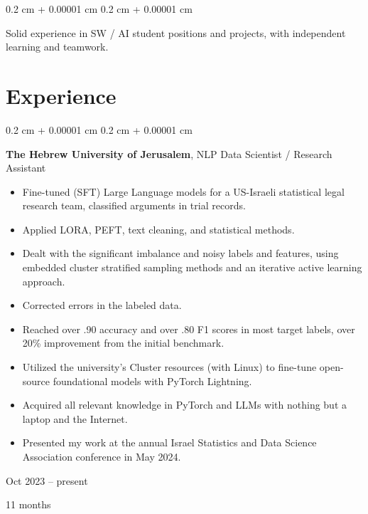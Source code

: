 \documentclass[10pt, letterpaper]{article}
\newenvironment{highlights}{
    \begin{itemize}[
        topsep=0.10 cm,
        parsep=0.10 cm,
        partopsep=0pt,
        itemsep=0pt,
        leftmargin=0.4 cm + 10pt
    ]
}{
    \end{itemize}
} %
\newenvironment{onecolentry}{
    \begin{adjustwidth}{
        0.2 cm + 0.00001 cm
    }{
        0.2 cm + 0.00001 cm
    }
}{
    \end{adjustwidth}
} %
\newenvironment{twocolentry}[2][]{
    \onecolentry
    \def\secondColumn{#2}
    \setcolumnwidth{\fill, 4.5 cm}
    \begin{paracol}{2}
}{
    \switchcolumn \raggedleft \secondColumn
    \end{paracol}
    \endonecolentry
} %
\begin{document}
        \vspace{0.2 cm}

        \begin{onecolentry}
            Solid experience in SW / AI student positions and projects, with independent learning and teamwork.
        \end{onecolentry}


    
    \section{Experience}



        
        \begin{twocolentry}{
            Oct 2023 – present

        11 months
        }
            \textbf{The Hebrew University of Jerusalem}, NLP Data Scientist / Research Assistant
            \begin{highlights}
                \item Fine-tuned (SFT) Large Language models for a US-Israeli statistical legal research team, classified arguments in trial records.
                \item Applied LORA, PEFT, text cleaning, and statistical methods.
                \item Dealt with the significant imbalance and noisy labels and features, using embedded cluster stratified sampling methods and an iterative active learning approach.
                \item Corrected errors in the labeled data.
                \item Reached over .90 accuracy and over .80 F1 scores in most target labels, over 20\% improvement from the initial benchmark.
                \item Utilized the university's Cluster resources (with Linux) to fine-tune open-source foundational models with PyTorch Lightning.
                \item Acquired all relevant knowledge in PyTorch and LLMs with nothing but a laptop and the Internet.
                \item Presented my work at the annual Israel Statistics and Data Science Association conference in May 2024.
            \end{highlights}
        \end{twocolentry}


        \vspace{0.2 cm}
\end{document}
